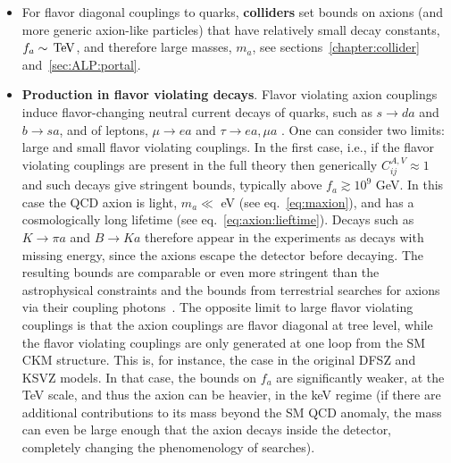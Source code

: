 \begin{itemize}
\item[\scalebox{0.6}{$\blacksquare$}] For flavor diagonal couplings to quarks, {\bf colliders} set bounds on axions (and more generic axion-like particles) that have relatively small decay constants, $f_a\sim \,{\rm TeV}$,
and therefore large masses, $m_a$, see sections~\ref{chapter:collider} and~\ref{sec:ALP:portal}.

\item[\scalebox{0.6}{$\blacksquare$}] {\bf Production in flavor violating decays}. 
Flavor violating axion couplings induce flavor-changing neutral current decays of quarks, 
such as $s\to d a$ and $b\to s a$, and of leptons, $\mu \to e a$ and $\tau \to e a, \mu a$ \cite{axion:flavor}. One can consider two limits: large and small flavor violating couplings. In the first case, i.e., if the flavor violating couplings are present in the full theory then generically  $C_{ij}^{A,V}\approx1$ and such decays give stringent bounds, typically 
above $f_a\gtrsim 10^9$ GeV. In this case the QCD axion is light, $m_a\ll$ eV (see eq.~\eqref{eq:maxion}), and has a cosmologically long lifetime (see eq.~\eqref{eq:axion:lieftime}). Decays such as $K\to \pi a$ and $B\to Ka$ therefore appear in the experiments as decays with missing energy, 
since the axions escape the detector before decaying. 
The resulting bounds are comparable or even more stringent than the astrophysical constraints and the bounds from terrestrial searches for axions via their coupling photons~\cite{axiflavon}. The opposite limit to large flavor violating couplings is that the axion couplings are flavor diagonal at tree level, while the flavor violating couplings are only generated at one loop from the SM CKM structure. This is, for instance, the case in the original DFSZ and KSVZ models. In that case, the bounds on $f_a$ are significantly weaker, at the TeV scale, and thus the axion can be heavier, in the keV regime (if there are additional contributions to its mass beyond the SM QCD anomaly, the mass can even be large enough that the axion decays inside the detector, completely changing the phenomenology of searches).


\end{itemize}
